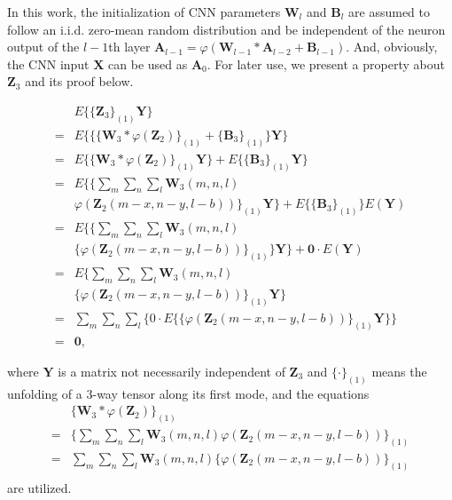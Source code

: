 \documentclass[journal]{IEEEtran}
\begin{document}
In this work, the initialization of CNN parameters $\mathbf{W}_l$ and $\mathbf{B}_l$ are assumed to follow an i.i.d. zero-mean random distribution and be independent of the neuron output of the $l-1$th layer $\mathbf{A}_{l-1}=\varphi(\mathbf{W}_{l-1}*\mathbf{A}_{l-2}+\mathbf{B}_{l-1})$. And, obviously, the CNN input $\mathbf{X}$ can be used as $\mathbf{A}_0$. For later use, we present a property about $\mathbf{Z}_3$ and its proof below.
\begin{normalsize}
\begin{equation}\label{eq:finalexpectation2}
\begin{split}
&E\{\{\mathbf{Z}_3\}_{(1)}\mathbf{Y}\}\\
=&E\{\{\{\mathbf{W}_3*\varphi(\mathbf{Z}_{2})\}_{(1)}+\{\mathbf{B}_3\}_{(1)}\}\mathbf{Y}\}\\
=&E\{\{\mathbf{W}_3*\varphi(\mathbf{Z}_{2})\}_{(1)}\mathbf{Y}\}+E\{\{\mathbf{B}_3\}_{(1)}\mathbf{Y}\}\\
=&E\{\{\sum\limits_{m}\sum\limits_{n}\sum\limits_{l}\mathbf{W}_3(m, n, l)\\
&\varphi(\mathbf{Z}_{2}(m-x, n-y, l-b))\}_{(1)}\mathbf{Y}\}+E\{\{\mathbf{B}_3\}_{(1)}\}E(\mathbf{Y})\\
=&E\{\{\sum\limits_{m}\sum\limits_{n}\sum\limits_{l}\mathbf{W}_3(m, n, l)\\
&\{\varphi(\mathbf{Z}_{2}(m-x, n-y, l-b))\}_{(1)}\}\mathbf{Y}\}+\mathbf{0}\cdot E(\mathbf{Y})\\
=&E\{\sum\limits_{m}\sum\limits_{n}\sum\limits_{l}\mathbf{W}_3(m, n, l) \\
&\{\varphi(\mathbf{Z}_{2}(m-x, n-y, l-b))\}_{(1)}\mathbf{Y}\}\\
=&\sum\limits_{m}\sum\limits_{n}\sum\limits_{l}\{0\cdot
E\{\{\varphi(\mathbf{Z}_{2}(m-x, n-y, l-b))\}_{(1)}\mathbf{Y}\}\}\\
=&\mathbf{0},
\end{split}
\end{equation}
\end{normalsize}
where $\mathbf{Y}$ is a matrix not necessarily independent of $\mathbf{Z}_3$ and
$\{\cdot\}_{(1)}$ means the unfolding of a 3-way tensor along its first mode, and the equations
\begin{equation}
\label{eq:tensorconv}
\begin{split}
&\{\mathbf{W}_3*\varphi(\mathbf{Z}_{2})\}_{(1)}\\
=&\{\sum\limits_{m}\sum\limits_{n}\sum\limits_{l}\mathbf{W}_3(m, n, l)
\varphi(\mathbf{Z}_{2}(m-x, n-y, l-b))\}_{(1)}\\
=&\sum\limits_{m}\sum\limits_{n}\sum\limits_{l}\mathbf{W}_3(m, n, l)
\{\varphi(\mathbf{Z}_{2}(m-x, n-y, l-b))\}_{(1)}\\
\end{split}
\end{equation}
are utilized.
\end{document}
